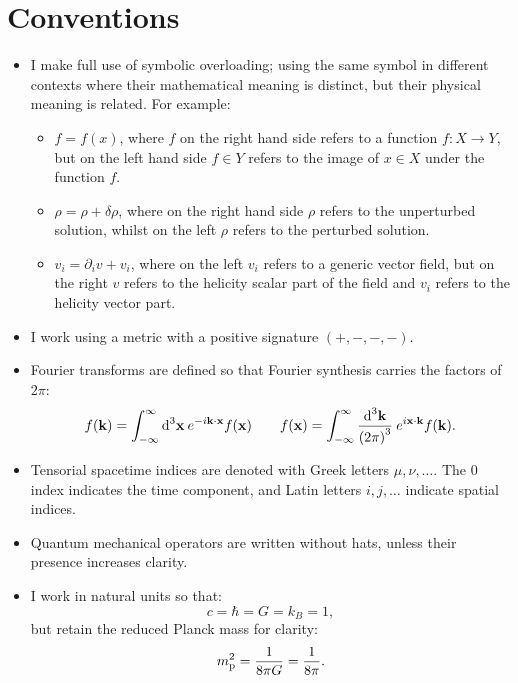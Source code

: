 \chapter{Conventions}
\label{sec:cos:conventions}


\begin{itemize}
  \item I make full use of symbolic overloading; using the same symbol in different contexts where their mathematical meaning is distinct, but their physical meaning is related. For example:
    \begin{itemize}
      \item \(f=f(x)\), where \(f\) on the right hand side refers to a function \({f:X\to Y}\), but on the left hand side \(f\in Y\) refers to the image of \(x\in X\) under the function \(f\).
      \item \(\rho = \rho + \delta\rho\), where on the right hand side \(\rho\) refers to the unperturbed solution, whilst on the left \(\rho\) refers to the perturbed solution.
      \item \(v_i = \partial_i v + v_i\), where on the left \(v_i\) refers to a generic vector field, but on the right \(v\) refers to the helicity scalar part of the field and \(v_i\) refers to the helicity vector part.
    \end{itemize}
  \item I work using a metric with a positive signature \((+,-,-,-)\).
  \item Fourier transforms are defined so that Fourier synthesis carries the factors of \(2\pi\):
    \begin{equation}
      f(\vk) = \int_{-\infty}^{\infty} \d[3]{\vx}\: e^{-i \vk\cdot\vx} f(\vx) \qquad f(\vx) = \int_{-\infty}^{\infty} \frac{\d[3]{\vk}}{{(2\pi)}^3}\: e^{i \vx\cdot\vk} f(\vk).
      \label{eqn:cos:fourier_transform}
    \end{equation}
  \item Tensorial spacetime indices are denoted with Greek letters \(\mu,\nu,\ldots\). The \(0\) index indicates the time component, and Latin letters \(i,j,\ldots\) indicate spatial indices.
  \item Quantum mechanical operators are written without hats, unless their presence increases clarity.
  \item I work in natural units so that:
    \begin{equation}
      c = \hbar = G = k_B = 1,
      \label{eqn:cos:natural_units}
    \end{equation}
    but retain the reduced Planck mass for clarity:
    \begin{equation}
      \m^2 = \frac{1}{8\pi G} = \frac{1}{8\pi}.
      \label{eqn:cos:reduced_planck_mass}
    \end{equation}
\end{itemize}


